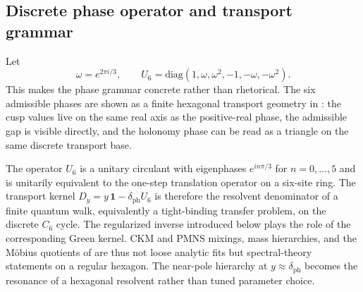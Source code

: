 \subsection{Discrete phase operator and transport grammar}

Let
\[
\omega=e^{2\pi i/3},
\qquad
U_6=\mathrm{diag}(1,\omega,\omega^2,-1,-\omega,-\omega^2).
\]
This makes the phase grammar concrete rather than rhetorical. The six admissible phases are shown as a finite hexagonal transport geometry in : the cusp values live on the same real axis as the positive-real phase, the admissible gap is visible directly, and the holonomy phase can be read as a triangle on the same discrete transport base.

\begin{remark}
The operator $U_6$ is a unitary circulant with eigenphases $e^{in\pi/3}$ for $n=0,\dots,5$ and is unitarily equivalent to the one-step translation operator on a six-site ring. The transport kernel $D_y=y\,\mathbf 1-\delta_{\mathrm{ph}}U_6$ is therefore the resolvent denominator of a finite quantum walk, equivalently a tight-binding transfer problem, on the discrete $C_6$ cycle. The regularized inverse introduced below plays the role of the corresponding Green kernel. CKM and PMNS mixings, mass hierarchies, and the Möbius quotients of  are thus not loose analytic fits but spectral-theory statements on a regular hexagon. The near-pole hierarchy at $y\approx\delta_{\mathrm{ph}}$ becomes the resonance of a hexagonal resolvent rather than tuned parameter choice.
\end{remark}

